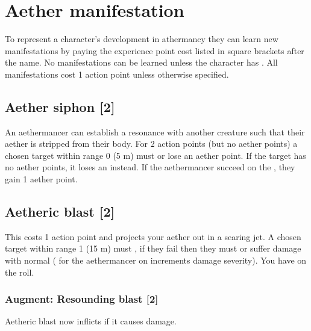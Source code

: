 \section{Aether manifestation}
\label{sec:spells}

To represent a character's development in athermancy they can learn new manifestations by paying the experience point cost listed in square brackets after the name. No manifestations can be learned unless the character has . All manifestations cost 1 action point unless otherwise specified.

%
\subsection{Aether siphon [2]}
An aethermancer can establish a resonance with another creature such that their aether is stripped from their body. For 2 action points (but no aether points) a chosen target within range 0 (5 m) must  or lose an aether point. If the target has no aether points, it loses an  instead. If the aethermancer succeed on the , they gain 1 aether point.


\subsection{Aetheric blast [2]}
\label{spell:sorc-blast}
This costs 1 action point and projects your aether out in a searing jet. A chosen target within range 1 (15 m) must , if they fail then they must  or suffer damage with normal  ( for the aethermancer on  increments damage severity). You have  on the  roll. 
\subsubsection{Augment: Resounding blast [2]}
Aetheric blast now inflicts  if it causes damage.



